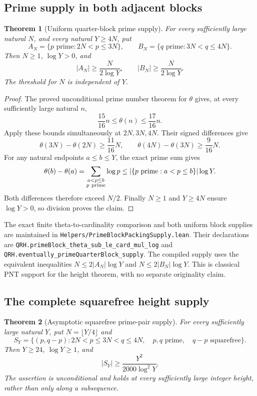 \documentclass[11pt]{article}
\newtheorem{theorem}{Theorem}[section]
\begin{document}
\subsection{Prime supply in both adjacent blocks}

\begin{theorem}[Uniform quarter-block prime supply]
\label{thm:prime-quarter-block-supply}
For every sufficiently large natural \(N\), and every natural
\(Y\ge4N\), put
\[
 A_N=\{p\text{ prime}:2N<p\le3N\},\qquad
 B_N=\{q\text{ prime}:3N<q\le4N\}.
\]
Then \(N\ge1\), \(\log Y>0\), and
\[
 |A_N|\ge\frac{N}{2\log Y},\qquad
 |B_N|\ge\frac{N}{2\log Y}.
\]
The threshold for \(N\) is independent of \(Y\).
\end{theorem}

\begin{proof}
The proved unconditional prime number theorem for \(\theta\) gives,
at every sufficiently large natural \(n\),
\[
 \frac{15}{16}n\le\theta(n)\le\frac{17}{16}n.
\]
Apply these bounds simultaneously at \(2N,3N,4N\). Their signed
differences give
\[
 \theta(3N)-\theta(2N)\ge\frac{11}{16}N,\qquad
 \theta(4N)-\theta(3N)\ge\frac9{16}N.
\]
For any natural endpoints \(a\le b\le Y\), the exact prime sum gives
\[
 \theta(b)-\theta(a)
   =\sum_{\substack{a<p\le b\\p\ {\rm prime}}}\log p
   \le |\{p\text{ prime}:a<p\le b\}|\log Y.
\]
Both differences therefore exceed \(N/2\). Finally \(N\ge1\)
and \(Y\ge4N\) ensure \(\log Y>0\), so division proves the claim.
\end{proof}

The exact finite theta-to-cardinality comparison and both uniform
block supplies are maintained in
\texttt{Helpers/PrimeBlockPackingSupply.\allowbreak lean}.
Their declarations are
\texttt{QRH.primeBlock\_theta\_sub\_le\_card\_mul\_log} and
\texttt{QRH.eventually\_primeQuarterBlock\_supply}.
The compiled supply uses the equivalent inequalities
\(N\le2|A_N|\log Y\) and \(N\le2|B_N|\log Y\).
This is classical PNT support for the height theorem, with no separate
originality claim.

\subsection{The complete squarefree height supply}

\begin{theorem}[Asymptotic squarefree prime-pair supply]
\label{thm:asymptotic-squarefree-prime-pairs}
For every sufficiently large natural \(Y\), put \(N=\lfloor Y/4\rfloor\)
and
\[
 S_Y=\{(p,q-p):2N<p\le3N<q\le4N,\quad
                   p,q\text{ prime},\quad q-p\text{ squarefree}\}.
\]
Then \(Y\ge24\), \(\log Y\ge1\), and
\[
                         |S_Y|\ge\frac{Y^2}{2000\log^2Y}.
\]
The assertion is unconditional and holds at every sufficiently large
integer height, rather than only along a subsequence.
\end{theorem}
\end{document}
